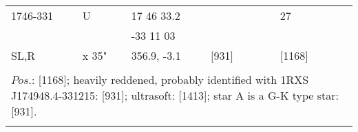 \documentclass{aa}
\begin{document}
\begin{tabular}{p{2.5cm}p{1cm}p{1.8cm}p{2.3cm}p{3.3cm}p{2.0cm}p{2.2cm}}
\noalign{\smallskip}
1746-331         & U                & 17 46 33.2            &                       &                          & 27                   &              \\
                          &                    & -33 11 03              &                       &                          &                         &                 \\
SL,R                 & x 35"         & 356.9, -3.1            &   [931]           &                          & [1168]             &            \\
\\
\multicolumn{7}{p{17.5cm}}{
$Pos$.: [1168]; heavily reddened, probably identified with 1RXS J174948.4-331215: [931]; ultrasoft: [1413]; 
star A is a G-K type star: [931].}\\
\noalign{\smallskip}
\hline

\end{tabular}
\end{document}

